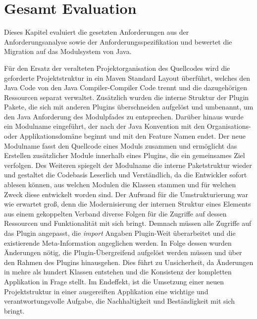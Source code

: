 \chapter{Gesamt Evaluation}
Dieses Kapitel evaluiert die gesetzten Anforderungen aus der Anforderungsanalyse sowie der Anforderungsspezifikation und bewertet die Migration auf das Modulsystem von Java.\bigbreak	



Für den Ersatz der veralteten Projektorganisation des Quellcodes wird die geforderte Projektstruktur in ein Maven Standard Layout überführt, welches den Java Code von den Java Compiler-Compiler Code trennt und die dazugehörigen Ressourcen separat verwaltet. Zusätzlich wurden die interne Struktur der Plugin Pakete, die sich mit anderen Plugins überschneiden aufgelöst und umbenannt, um den Java Anforderung des Modulpfades zu entsprechen. Darüber hinaus wurde ein Modulname eingeführt, der nach der Java Konvention mit den Organisations- oder Applikationsdomäne beginnt und mit den Feature Namen endet. Der neue Modulname fasst den Quellcode eines Moduls zusammen und ermöglicht das Erstellen zusätzlicher Module innerhalb eines Plugins, die ein gemeinsames Ziel verfolgen. Des Weiteren spiegelt der Modulname die interne Paketstruktur wieder und gestaltet die Codebasis Leserlich und Verständlich, da die Entwickler sofort ablesen können, aus welchen Modulen die Klassen stammen und für welchen Zweck diese entwickelt worden sind.\newline
Der Aufwand für die Umstrukturierung war wie erwartet groß, denn die Modernisierung der internen Struktur eines Elements aus einem gekoppelten Verband diverse Folgen für die Zugriffe auf dessen Ressourcen und Funktionalität mit sich bringt. Demnach müssen alle Zugriffe auf das Plugin angepasst, die \textit{import} Angaben Plugin-Weit überarbeitet und die existierende Meta-Information angeglichen werden. In Folge dessen wurden Änderungen nötig, die Plugin-Übergreifend aufgelöst werden müssen und über den Rahmen des Plugins hinausgehen. Dies führt zu Unsicherheit, da Änderungen in mehre als hundert Klassen entstehen und die Konsistenz der kompletten Applikation in Frage stellt. \newline
Im Endeffekt, ist die Umsetzung einer neuen Projektstruktur in einer ausgereiften Applikation eine wichtige und verantwortungsvolle Aufgabe, die  Nachhaltigkeit und Beständigkeit mit sich bringt.\bigbreak    

